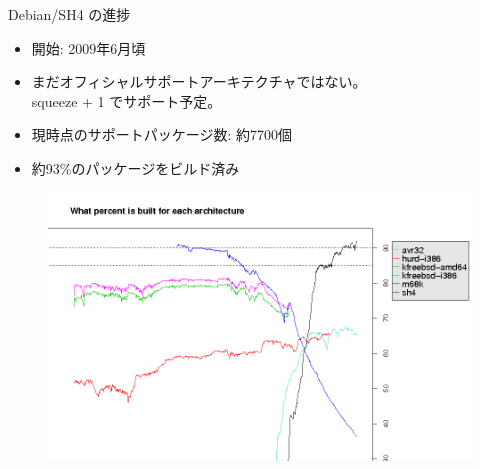 \frame{\titlepage{}}


\begin{frame}{Debian/SH4 の進捗}
\begin{itemize}
\item 開始: 2009年6月頃
\item まだオフィシャルサポートアーキテクチャではない。\\
squeeze + 1 でサポート予定。

\item 現時点のサポートパッケージ数: 約7700個
\item 約93\%のパッケージをビルド済み
\end{itemize}

\end{frame}

\begin{frame}
\begin{figure}[h]
\includegraphics[height=0.7\hsize]{image201004/emdebian1.png}
\label{fig:devwork}
\end{figure}
\end{frame}


